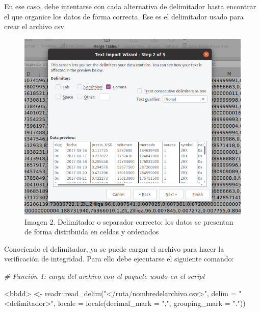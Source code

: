 \documentclass[
  spanish,
]{book}
\newenvironment{Shaded}{\begin{snugshade}}{\end{snugshade}}
\newcommand{\AttributeTok}[1]{\textcolor[rgb]{0.77,0.63,0.00}{#1}}
\newcommand{\CommentTok}[1]{\textcolor[rgb]{0.56,0.35,0.01}{\textit{#1}}}
\newcommand{\ErrorTok}[1]{\textcolor[rgb]{0.64,0.00,0.00}{\textbf{#1}}}
\newcommand{\FunctionTok}[1]{\textcolor[rgb]{0.00,0.00,0.00}{#1}}
\newcommand{\NormalTok}[1]{#1}
\newcommand{\SpecialCharTok}[1]{\textcolor[rgb]{0.00,0.00,0.00}{#1}}
\newcommand{\StringTok}[1]{\textcolor[rgb]{0.31,0.60,0.02}{#1}}
\begin{document}
En ese caso, debe intentarse con cada alternativa de delimitador hasta encontrar el que organice los datos de forma correcta. Ese es el delimitador usado para crear el archivo csv.

\begin{figure}
\centering
\includegraphics{imagenes/delimitador_correcto.png}
\caption{Imagen 2. Delimitador o separador correcto: los datos se presentan de forma distribuida en celdas y ordenados}
\end{figure}

Conociendo el delimitador, ya se puede cargar el archivo para hacer la verificación de integridad. Para ello debe ejecutarse el siguiente comando:

\begin{Shaded}
\begin{Highlighting}[]
\CommentTok{\# Función 1: carga del archivo con el paquete usado en el script }

\SpecialCharTok{\textless{}}\NormalTok{bbdd}\SpecialCharTok{\textgreater{}} \ErrorTok{\textless{}}\SpecialCharTok{{-}}\NormalTok{ readr}\SpecialCharTok{::}\FunctionTok{read\_delim}\NormalTok{(}\StringTok{"\textless{}/ruta/nombredelarchivo.csv\textgreater{}"}\NormalTok{, }\AttributeTok{delim =} \StringTok{"\textless{}delimitador\textgreater{}"}\NormalTok{, }\AttributeTok{locale =} \FunctionTok{locale}\NormalTok{(}\AttributeTok{decimal\_mark =} \StringTok{","}\NormalTok{, }\AttributeTok{grouping\_mark =} \StringTok{"."}\NormalTok{))}
\end{Highlighting}
\end{Shaded}
\end{document}
